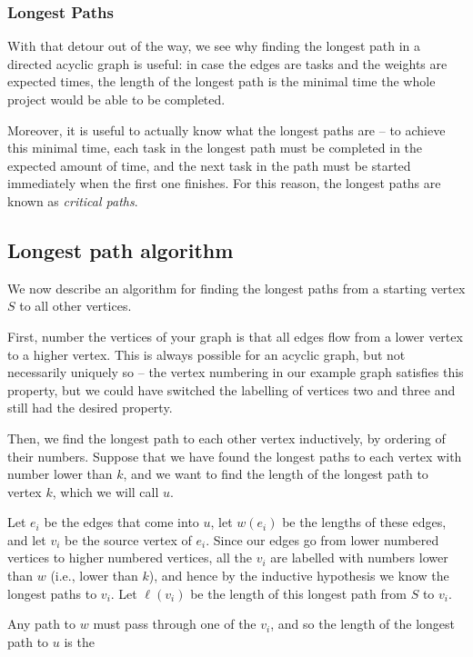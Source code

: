 \documentclass[]{article}
\begin{document}
\subsubsection{Longest Paths}\label{longest-paths}

With that detour out of the way, we see why finding the longest path in
a directed acyclic graph is useful: in case the edges are tasks and the
weights are expected times, the length of the longest path is the
minimal time the whole project would be able to be completed.

Moreover, it is useful to actually know what the longest paths are -- to
achieve this minimal time, each task in the longest path must be
completed in the expected amount of time, and the next task in the path
must be started immediately when the first one finishes. For this
reason, the longest paths are known as \emph{critical paths}.

\subsection{Longest path algorithm}\label{longest-path-algorithm}

We now describe an algorithm for finding the longest paths from a
starting vertex \(S\) to all other vertices.

First, number the vertices of your graph is that all edges flow from a
lower vertex to a higher vertex. This is always possible for an acyclic
graph, but not necessarily uniquely so -- the vertex numbering in our
example graph satisfies this property, but we could have switched the
labelling of vertices two and three and still had the desired property.

Then, we find the longest path to each other vertex inductively, by
ordering of their numbers. Suppose that we have found the longest paths
to each vertex with number lower than \(k\), and we want to find the
length of the longest path to vertex \(k\), which we will call \(u\).

Let \(e_i\) be the edges that come into \(u\), let \(w(e_i)\) be the
lengths of these edges, and let \(v_i\) be the source vertex of \(e_i\).
Since our edges go from lower numbered vertices to higher numbered
vertices, all the \(v_i\) are labelled with numbers lower than \(w\)
(i.e., lower than \(k\)), and hence by the inductive hypothesis we know
the longest paths to \(v_i\). Let \(\ell(v_i)\) be the length of this
longest path from \(S\) to \(v_i\).

Any path to \(w\) must pass through one of the \(v_i\), and so the
length of the longest path to \(u\) is the
\end{document}
